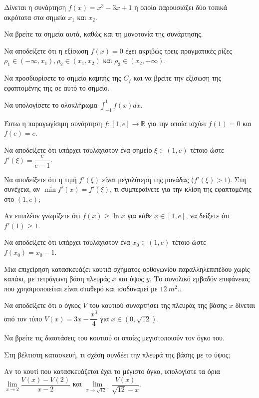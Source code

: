 \documentclass[a4paper,11pt,twoside]{article}
\newcommand{\kerkissans}[1]{{\fontfamily{maksf}\selectfont {#1}}}
\newcommand\thema{Γ}
\newcounter{askhsh}[section]
\renewcommand{\theaskhsh}{\arabic{askhsh}}
\newcommand{\Askhsh}{\refstepcounter{askhsh}{\textbf{\textcolor{black}{\faPenSquare\ \  \large \kerkissans{\textbf{\theaskhshο\hspace{2mm}Θέμα}}}}}\hspace{0mm}}{}
\newenvironment{askhsh}[1]
{\begin{tcolorbox}[title=\Askhsh\kerkissans{\textbf{\large{  #1}}},breakable,
enhanced standard,titlerule=0pt,toprule=0pt, rightrule=0pt, bottomrule=0pt,
colback=white,left=0mm,top=1mm,bottom=0mm,
boxrule=0pt,
colframe=white,leftrule=0mm,sharp corners,coltitle=black]
\renewcommand{\thema}{#1}}
{\end{tcolorbox}}
\newcommand{\dint}{\displaystyle\int}
\begin{document}
\begin{askhsh}{Γ}
Δίνεται η συνάρτηση $f(x) = x^3 - 3x + 1$ η οποία παρουσιάζει δύο τοπικά ακρότατα στα σημεία $x_1$ και $x_2$.
\begin{erwthma}
  \item Να βρείτε τα σημεία αυτά, καθώς και τη μονοτονία της συνάρτησης.
  \item Να αποδείξετε ότι η εξίσωση $f(x) = 0$ έχει ακριβώς τρεις πραγματικές ρίζες $\rho_1 \in (-\infty, x_1), \rho_2 \in (x_1, x_2)$ και $\rho_3 \in (x_2, +\infty)$.
  \item Να προσδιορίσετε το σημείο καμπής της $C_f$ και να βρείτε την εξίσωση της εφαπτομένης της σε αυτό το σημείο.
  \item Να υπολογίσετε το ολοκλήρωμα $\dint_{-1}^1 f(x)dx$.
\end{erwthma}
\end{askhsh}

\begin{askhsh}{Γ}
Έστω η παραγωγίσιμη συνάρτηση $f: [1, e] \to \mathbb{R}$ για την οποία ισχύει $f(1)=0$ και $f(e)=e$.
\begin{erwthma}
  \item Να αποδείξετε ότι υπάρχει τουλάχιστον ένα σημείο $\xi \in (1, e)$ τέτοιο ώστε $f'(\xi) = \dfrac{e}{e-1}$.
  \item Να αποδείξετε ότι η τιμή $f'(\xi)$ είναι μεγαλύτερη της μονάδας ($f'(\xi) > 1$). Στη συνέχεια, αν $\min f'(x) = f'(\xi)$, τι συμπεραίνετε για την κλίση της εφαπτομένης στο $(1, e)$;
  \item Αν επιπλέον γνωρίζετε ότι $f(x) \ge \ln x$ για κάθε $x \in [1, e]$, να δείξετε ότι $f'(1) \ge 1$.
  \item Να αποδείξετε ότι υπάρχει τουλάχιστον ένα $x_0 \in (1, e)$ τέτοιο ώστε $f(x_0) = x_0 - 1$. 
\end{erwthma}
\end{askhsh}

\begin{askhsh}{Γ}
Μια επιχείρηση κατασκευάζει κουτιά σχήματος ορθογωνίου παραλληλεπιπέδου χωρίς καπάκι, με τετράγωνη βάση πλευράς $x$ και ύψος $y$. Το συνολικό εμβαδόν επιφάνειας που χρησιμοποιείται είναι σταθερό και ισοδυναμεί με $12\ \si{m^2}.$.
\begin{erwthma}
  \item Να αποδείξετε ότι ο όγκος $V$ του κουτιού συναρτήσει της πλευράς της βάσης $x$ δίνεται από τον τύπο $V(x) = 3x - \dfrac{x^3}{4}$ για $x \in (0, \sqrt{12})$.
  \item Να βρείτε τις διαστάσεις του κουτιού οι οποίες μεγιστοποιούν τον όγκο του. 
  \item Στη βέλτιστη κατασκευή, τι σχέση συνδέει την πλευρά της βάσης με το ύψος;
  \item Αν το κουτί που κατασκευάζεται έχει το μέγιστο όγκο, υπολογίστε τα όρια $\lim\limits_{x \to 2} \dfrac{V(x) - V(2)}{x-2}$ και $\lim\limits_{x \to \sqrt{12}^-} \dfrac{V(x)}{\sqrt{12}-x}$.
\end{erwthma}
\end{askhsh}
\end{document}
